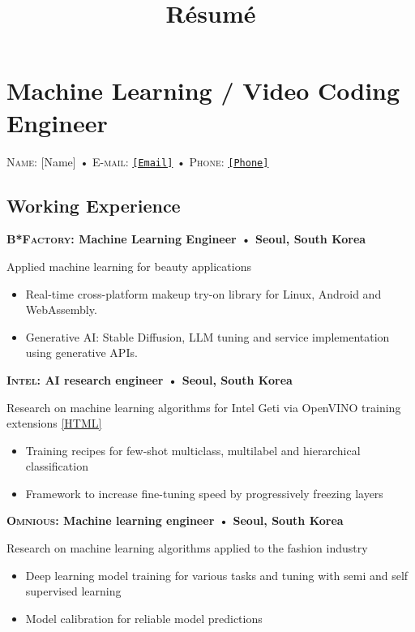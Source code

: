 \documentclass[10pt,a4paper]{article}
\title{Résumé}
\author{\myname{} \mysurname}
\newcommand{\html}[1]{\href{#1}{\scriptsize\textsc{[HTML]}}}
\newcommand{\sep}{\- • \-}
\newcommand{\years}[1]{{\marginnote{\small{\condensed{#1}}}}}
\newcommand{\company}[4]{\years{#1}{\bf\textsc{#2}: {#3} \sep{} {#4}}}
\newcommand{\mysubsection}[1]{\vspace{-\topsep}\subsection*{#1}}
\newcommand{\myname}{[Name]}
\newcommand{\myemail}{[Email]}
\newcommand{\myphonelink}{[Phone]}
\newcommand{\myphonetext}{[Phone]}
\begin{document}
\pagestyle{empty}
\setlength{\parindent}{0pt}
\allsectionsfont{\scshape}
\setlength{\marginparsep}{8pt}

\section*{\huge Machine Learning / Video Coding Engineer}
\vspace{-\topsep}
\textsc{Name:}
\myname{} \textsc{\mysurname}
\sep{}
\textsc{E-mail:}
\href{mailto:\myemail}{\texttt{\myemail}}
\sep{}
\textsc{Phone:}
\href{tel:\myphonelink}{\texttt{\myphonetext}}
\vspace{\topsep}

\mysubsection{Working Experience}

\company{2023 — \the\year{}}{B*Factory}{Machine Learning Engineer}{Seoul, South Korea}

Applied machine learning for beauty applications
\begin{itemize}[noitemsep, topsep=0pt, left=0pt]
    \item Real-time cross-platform makeup try-on library for Linux, Android and WebAssembly.
    \item Generative AI: Stable Diffusion, LLM tuning and service implementation using generative APIs.
\end{itemize}

\company{2022 — 2023}{Intel}{AI research engineer}{Seoul, South Korea}

Research on machine learning algorithms for Intel\textregistered{} Geti\texttrademark{} via OpenVINO\texttrademark{} training extensions \html{https://github.com/openvinotoolkit/training_extensions}
\begin{itemize}[noitemsep, topsep=0pt, left=0pt]
    \item Training recipes for few-shot multiclass, multilabel and hierarchical classification
    \item Framework to increase fine-tuning speed by progressively freezing layers
\end{itemize}

\company{2019 — 2022}{Omnious}{Machine learning engineer}{Seoul, South Korea}

Research on machine learning algorithms applied to the fashion industry
\begin{itemize}[noitemsep, topsep=0pt, left=0pt]
    \item Deep learning model training for various tasks and tuning with semi and self supervised learning
    \item Model calibration for reliable model predictions
\end{itemize}
\end{document}
